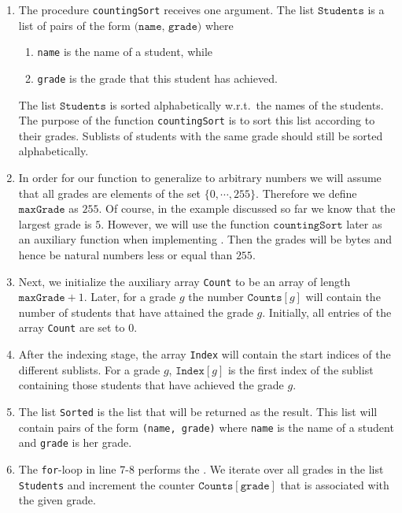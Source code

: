 \begin{enumerate}
\item The procedure \texttt{countingSort} receives one argument.  The list $\texttt{Students}$
      is a list of pairs of the form $\texttt{(name, grade)}$ where
      \begin{enumerate}
      \item \texttt{name}  is the name of a student, while
      \item \texttt{grade} is the grade that this student has achieved.
      \end{enumerate}
      The list $\texttt{Students}$ is sorted alphabetically w.r.t.~the names of the students.
      The purpose of the function \texttt{countingSort} is to sort this list according to their grades.
      Sublists of students with the same grade should still be sorted alphabetically.
\item In order for our function to generalize to arbitrary numbers we will assume that all grades are elements
      of the set $\{0,\cdots,255\}$.  Therefore we define $\mathtt{maxGrade}$ as $255$.
      Of course, in the example discussed so far we know that the largest
      grade is $5$.  However, we will use the function $\mathtt{countingSort}$ later as an auxiliary function
      when implementing .  Then the grades will be bytes and hence be natural numbers less
      or equal than $255$.
\item Next, we initialize the auxiliary array \texttt{Count} to be an array of length $\texttt{maxGrade}+1$.
      Later, for a grade $g$ the number $\texttt{Counts}[g]$ will contain the number of students that have
      attained the grade $g$.  Initially, all entries of the array \texttt{Count} are set to $0$.
\item After the indexing stage, the array \texttt{Index} will contain the start indices of the different sublists.
      For a grade $g$, $\texttt{Index}[g]$ is the first index of the sublist containing those students that
      have achieved the grade $g$.
\item The list \texttt{Sorted} is the list that will be returned as the result.
      This list will contain pairs of the form \texttt{(name, grade)} where \texttt{name} is the name of a student
      and \texttt{grade} is her grade.
\item The \texttt{for}-loop in line 7-8 performs the .  We iterate over all grades
      in the list \texttt{Students} and increment the counter $\texttt{Counts}[\mathtt{grade}]$ that is associated with the given grade.

\end{enumerate}
